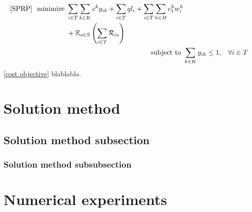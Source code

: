\documentclass[3p,review,a4paper]{elsarticle}
\begin{document}
\begin{subequations} \label{MODEL SPRP}
        \renewcommand{\theequation}{\theparentequation.\arabic{equation}}
\begin{align} 
\label{cost objective}
\begin{split}
        \text{[SPRP] ~minimize~}
        & \sum_{i \in T} \sum_{k \in K} c^k y_{ik}
        + \sum_{i \in T} q l_i
        + \sum_{i \in T} \sum_{h \in {H}} c_1^h w_i^h \\
        & + \mathbb{E}_{s \in S} \left(\sum_{i \in T}\mathcal{R}_{is}\right)
\end{split} \\
\label{constraint}
\text{subject to~}
        & \sum_{k \in K} y_{ik} \leq 1, 
        & \forall i \in T
\end{align}
\end{subequations}
\eqref{cost objective} blablabla.


\section{Solution method} \label{SEC: Solution method}

\subsection{Solution method subsection} \label{SUBSEC: Solution method subsection}

\subsubsection{Solution method subsubsection} \label{SUBSUBSEC: Solution method subsubsection}

\section{Numerical experiments}\label{SEC: Numerical experiments}
\end{document}
